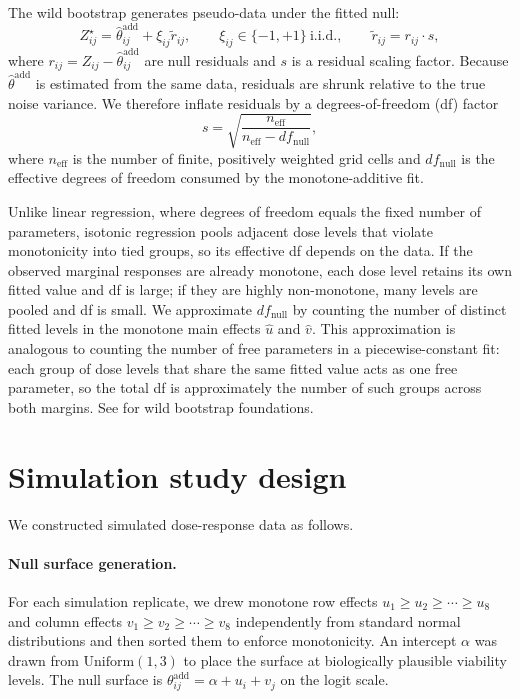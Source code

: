 \documentclass[pdflatex,sn-nature]{sn-jnl}%
\begin{document}
The wild bootstrap generates pseudo-data under the fitted null:
\begin{equation}
Z^\star_{ij}=\hat\theta^{\mathrm{add}}_{ij}+\xi_{ij}\tilde r_{ij},\qquad
\xi_{ij}\in\{-1,+1\}\ \text{i.i.d.},\qquad
\tilde r_{ij}=r_{ij}\cdot s,
\end{equation}
where $r_{ij}=Z_{ij}-\hat\theta^{\mathrm{add}}_{ij}$ are null residuals and $s$ is a residual scaling factor.
Because $\hat\theta^{\mathrm{add}}$ is estimated from the same data, residuals are shrunk relative to the true noise variance.
We therefore inflate residuals by a degrees-of-freedom (df) factor
\begin{equation}
s=\sqrt{\frac{n_{\mathrm{eff}}}{n_{\mathrm{eff}}-df_{\mathrm{null}}}},
\end{equation}
where $n_{\mathrm{eff}}$ is the number of finite, positively weighted grid cells and $df_{\mathrm{null}}$ is the effective degrees of freedom consumed by the monotone-additive fit.

Unlike linear regression, where degrees of freedom equals the fixed number of parameters, isotonic regression pools adjacent dose levels that violate monotonicity into tied groups, so its effective df depends on the data.
If the observed marginal responses are already monotone, each dose level retains its own fitted value and df is large; if they are highly non-monotone, many levels are pooled and df is small.
We approximate $df_{\mathrm{null}}$ by counting the number of distinct fitted levels in the monotone main effects $\hat u$ and $\hat v$.
This approximation is analogous to counting the number of free parameters in a piecewise-constant fit: each group of dose levels that share the same fitted value acts as one free parameter, so the total df is approximately the number of such groups across both margins.
See \cite{Wu1986} for wild bootstrap foundations.

\section{Simulation study design}

We constructed simulated dose-response data as follows.

\paragraph{Null surface generation.}
For each simulation replicate, we drew monotone row effects $u_1 \ge u_2 \ge \cdots \ge u_8$ and column effects $v_1 \ge v_2 \ge \cdots \ge v_8$ independently from standard normal distributions and then sorted them to enforce monotonicity.
An intercept $\alpha$ was drawn from $\mathrm{Uniform}(1,3)$ to place the surface at biologically plausible viability levels.
The null surface is $\theta^{\mathrm{add}}_{ij} = \alpha + u_i + v_j$ on the logit scale.
\end{document}
